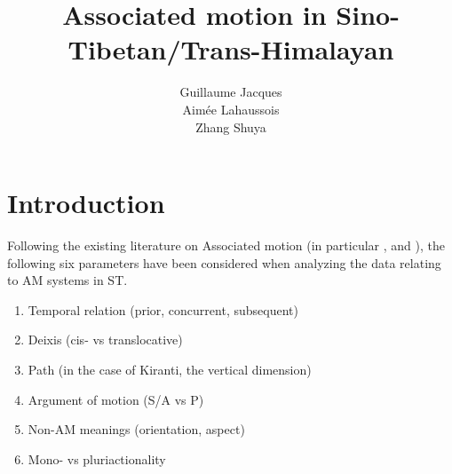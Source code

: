 \documentclass[oneside,a4paper,11pt]{article}
\begin{document}
 
\title{Associated motion in Sino-Tibetan/Trans-Himalayan}
\author{Guillaume Jacques\\ Aimée Lahaussois \\ Zhang Shuya}
\maketitle
%
%
%

\section{Introduction}

Following the existing literature on Associated motion (in particular \citealt{koch84associated.motion}, \citealt{wilkins91associated.motion} and \citealt{guillaume16am}), the following six parameters have been considered when analyzing the data relating to AM systems in ST.

\begin{enumerate}
\item Temporal relation (prior, concurrent, subsequent)
\item Deixis (cis- vs translocative)
\item Path (in the case of Kiranti, the vertical dimension)
\item Argument of motion (S/A vs P)
\item Non-AM meanings (orientation, aspect)
\item Mono- vs pluriactionality
\end{enumerate}
\end{document}
